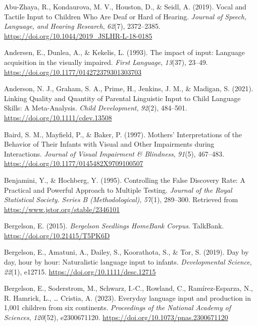 \documentclass[
  man,floatsintext]{apa6}
\newlength{\cslhangindent}
\newlength{\cslentryspacingunit} %
\newenvironment{CSLReferences}[2] %
 {%
  \setlength{\parindent}{0pt}
  \ifodd #1
  \let\oldpar\par
  \def\par{\hangindent=\cslhangindent\oldpar}
  \fi
  \setlength{\parskip}{#2\cslentryspacingunit}
 }%
 {}
\begin{document}
\hypertarget{refs}{}
\begin{CSLReferences}{1}{0}
\leavevmode{}%
Abu-Zhaya, R., Kondaurova, M. V., Houston, D., \& Seidl, A. (2019). Vocal and {Tactile Input} to {Children Who Are Deaf} or {Hard} of {Hearing}. \emph{Journal of Speech, Language, and Hearing Research}, \emph{62}(7), 2372--2385. \url{https://doi.org/10.1044/2019_JSLHR-L-18-0185}

\leavevmode{}%
Andersen, E., Dunlea, A., \& Kekelis, L. (1993). The impact of input: Language acquisition in the visually impaired. \emph{First Language}, \emph{13}(37), 23--49. \url{https://doi.org/10.1177/014272379301303703}

\leavevmode{}%
Anderson, N. J., Graham, S. A., Prime, H., Jenkins, J. M., \& Madigan, S. (2021). Linking {Quality} and {Quantity} of {Parental Linguistic Input} to {Child Language Skills}: {A Meta-Analysis}. \emph{Child Development}, \emph{92}(2), 484--501. \url{https://doi.org/10.1111/cdev.13508}

\leavevmode{}%
Baird, S. M., Mayfield, P., \& Baker, P. (1997). Mothers' {Interpretations} of the {Behavior} of {Their Infants} with {Visual} and {Other Impairments} during {Interactions}. \emph{Journal of Visual Impairment \& Blindness}, \emph{91}(5), 467--483. \url{https://doi.org/10.1177/0145482X9709100507}

\leavevmode{}%
Benjamini, Y., \& Hochberg, Y. (1995). Controlling the {False Discovery Rate}: {A Practical} and {Powerful Approach} to {Multiple Testing}. \emph{Journal of the Royal Statistical Society. Series B (Methodological)}, \emph{57}(1), 289--300. Retrieved from \url{https://www.jstor.org/stable/2346101}

\leavevmode{}%
Bergelson, E. (2015). \emph{Bergelson {Seedlings HomeBank Corpus}}. TalkBank. \url{https://doi.org/10.21415/T5PK6D}

\leavevmode{}%
Bergelson, E., Amatuni, A., Dailey, S., Koorathota, S., \& Tor, S. (2019). Day by day, hour by hour: {Naturalistic} language input to infants. \emph{Developmental Science}, \emph{22}(1), e12715. \url{https://doi.org/10.1111/desc.12715}

\leavevmode{}%
Bergelson, E., Soderstrom, M., Schwarz, I.-C., Rowland, C., Ramírez-Esparza, N., R. Hamrick, L., \ldots{} Cristia, A. (2023). Everyday language input and production in 1,001 children from six continents. \emph{Proceedings of the National Academy of Sciences}, \emph{120}(52), e2300671120. \url{https://doi.org/10.1073/pnas.2300671120}


\end{CSLReferences}
\end{document}
